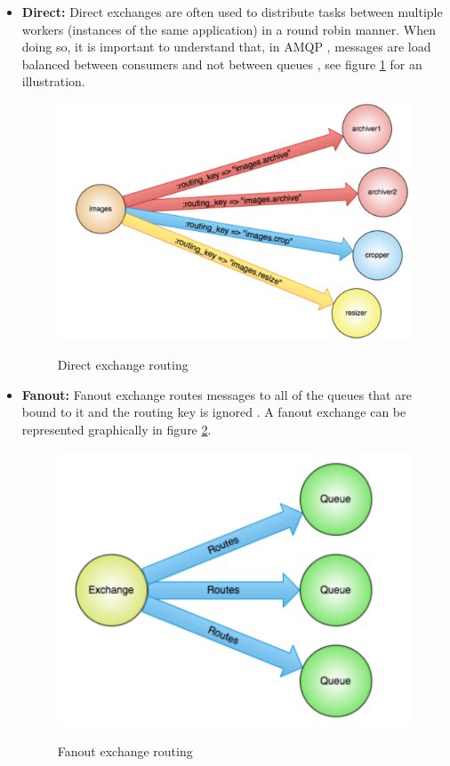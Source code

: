 \begin{itemize}
\item{\textbf{Direct:}} Direct exchanges are often used to distribute tasks between multiple workers (instances of the same application) in a round robin manner. When doing so, it is important to understand that, in \ac{AMQP} , messages are load balanced between consumers and not between queues \cite{amqp-concepts}, see figure \ref{fig:rabbit_mq_direct} for an illustration.

\begin{figure}[htb]
  \centering
  \includegraphics[scale=0.6]{rabbit_mq_direct.png}\\
  \caption{Direct exchange routing}
  \label{fig:rabbit_mq_direct}
  \protect\cite{amqp-concepts}
\end{figure}

\item{\textbf{Fanout:}} Fanout exchange routes messages to all of the queues that are bound to it and the routing key is ignored \cite{amqp-concepts}. A fanout exchange can be represented graphically in figure \ref{fig:rabbit_mq_fanout}.

\begin{figure}[htb]
  \centering
  \includegraphics[scale=0.6]{rabbit_mq_fanout.png}\\
  \caption{Fanout exchange routing}
  \label{fig:rabbit_mq_fanout}
  \protect\cite{amqp-concepts}
\end{figure}


\end{itemize}
